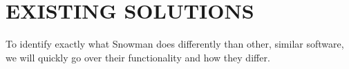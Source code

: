 \chapter{EXISTING SOLUTIONS}
\label{chap:existing_solutions}
To identify exactly what Snowman does differently than other, similar software,
we will quickly go over their functionality and how they differ.




